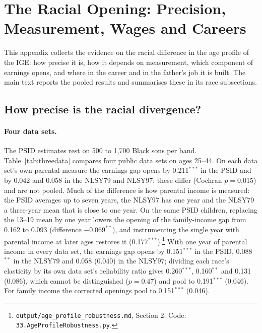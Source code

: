 \section{The Racial Opening: Precision, Measurement, Wages and Careers}\label{app:race}

This appendix collects the evidence on the racial difference in the age profile of the IGE: how precise it is, how it depends on measurement, which component of earnings opens, and where in the career and in the father's job it is built. The main text reports the pooled results and summarises these in its race subsections.



\subsection{How precise is the racial divergence?}

\paragraph{Four data sets.} The PSID estimates rest on 500 to 1,700 Black sons per band. Table~\ref{tab:threedata}
compares four public data sets on ages 25--44. On each data set's own parental measure the earnings gap opens by
0.211$^{***}$ in the PSID and by 0.042 and 0.058 in the NLSY79 and NLSY97; these differ (Cochran $p=0.015$) and are not
pooled. Much of the difference is how parental income is measured: the PSID averages up to seven years, the NLSY97 has
one year and the NLSY79 a three-year mean that is close to one year. On the same PSID children, replacing the 13--19
mean by one year lowers the opening of the family-income gap from 0.162 to 0.093 (difference $-0.069^{**}$), and
instrumenting the single year with parental income at later ages restores it (0.177$^{***}$).\footnote{\texttt{output/age\_profile\_robustness.md},
Section 2. Code: \texttt{33.AgeProfileRobustness.py}.} With one year of parental income in every data set, the
earnings gap opens by 0.151$^{***}$ in the PSID, 0.088$^{**}$ in the NLSY79 and 0.058 (0.040) in the NLSY97; dividing each
race's elasticity by its own data set's reliability ratio gives 0.260$^{***}$, 0.160$^{**}$ and 0.131 (0.086), which
cannot be distinguished ($p=0.47$) and pool to 0.191$^{***}$ (0.046). For family income the corrected openings pool to
0.151$^{***}$ (0.046).

